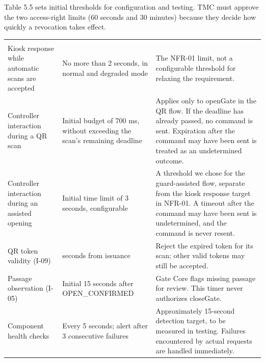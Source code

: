 Table 5.5 sets initial thresholds for configuration and testing. TMC must approve the two access-right limits (60 seconds and 30 minutes) because they decide how quickly a revocation takes effect.

\begin{longtable}{|>{\raggedright\arraybackslash}p{95.5pt}|>{\raggedright\arraybackslash}p{156.5pt}|>{\raggedright\arraybackslash}p{158.5pt}|}
\hline
\multicolumn{1}{|>{\columncolor{tableheader}\centering\arraybackslash}p{95.5pt}|}{\textbf{Item}} & \multicolumn{1}{>{\columncolor{tableheader}\centering\arraybackslash}p{156.5pt}|}{\textbf{Threshold or objective}} & \multicolumn{1}{>{\columncolor{tableheader}\centering\arraybackslash}p{158.5pt}|}{\textbf{Application}} \\
\hline
\endhead
\multicolumn{3}{c}{\rule{0pt}{20pt}\normalsize\phantomsection\addcontentsline{lot}{table}{\protect\numberline{5.5}Proposed Operating Thresholds and Recovery Objectives}\textbf{Table 5.5. Proposed Operating Thresholds and Recovery Objectives}} \\
\endlastfoot
Kiosk response while automatic scans are accepted & No more than 2 seconds, in normal and degraded mode & The NFR-01 limit, not a configurable threshold for relaxing the requirement. \\
\hline
Controller interaction during a QR scan & Initial budget of 700 ms, without exceeding the scan's remaining deadline & Applies only to openGate in the QR flow. If the deadline has already passed, no command is sent. Expiration after the command may have been sent is treated as an undetermined outcome. \\
\hline
Controller interaction during an assisted opening & Initial time limit of 3 seconds, configurable & A threshold we chose for the guard-assisted flow, separate from the kiosk response target in NFR-01. A timeout after the command may have been sent is undetermined, and the command is never resent. \\
\hline
QR token validity (I-09) & 60 seconds from issuance & Reject the expired token for its scan; other valid tokens may still be accepted. \\
\hline
Passage observation (I-05) & Initial 15 seconds after OPEN\_CONFIRMED & Gate Core flags missing passage for review. This timer never authorizes closeGate. \\
\hline
Component health checks & Every 5 seconds; alert after 3 consecutive failures & Approximately 15-second detection target, to be measured in testing. Failures encountered by actual requests are handled immediately. \\

\end{longtable}
